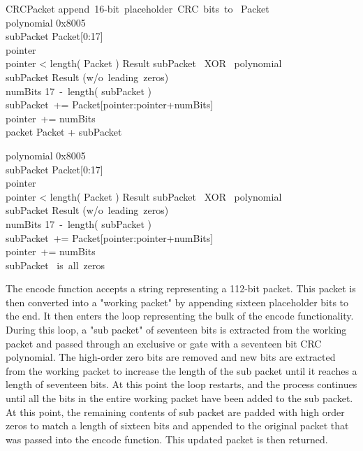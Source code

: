 \documentclass{sigcomm-alternate}
\begin{document}
\begin{pseudocode}{CRC}{Packet}
\mbox{append 16-bit placeholder CRC bits to } Packet\\
polynomial \GETS \mbox{0x8005}\\
subPacket \GETS Packet[0:17]\\
pointer \\
\WHILE pointer < \mbox{length(} Packet \mbox{)}
\DO
\BEGIN
Result \GETS subPacket \mbox{ XOR } polynomial\\
subPacket \GETS Result \mbox{(w/o leading zeros)}\\
numBits \GETS \mbox{17 - length(} subPacket \mbox{)}\\
subPacket\ += Packet[pointer:pointer+numBits]\\
pointer\ += numBits
\END\\
packet \GETS Packet + subPacket\\
\ENDPROCEDURE

polynomial \GETS \mbox{0x8005}\\
subPacket \GETS Packet[0:17]\\
pointer \\
\WHILE pointer < \mbox{length(} Packet \mbox{)}
\DO
\BEGIN
Result \GETS subPacket \mbox{ XOR } polynomial\\
subPacket \GETS Result \mbox{(w/o leading zeros)}\\
numBits \GETS \mbox{17 - length(} subPacket \mbox{)}\\
subPacket\ += Packet[pointer:pointer+numBits]\\
pointer\ += numBits
\END\\
\IF subPacket \mbox{ is all zeros}
\THEN
{}
\ELSE
\THEN
{}
\ENDPROCEDURE
\end{pseudocode}

The encode function accepts a string representing a 112-bit packet. This packet is then converted into a "working packet" by appending sixteen placeholder bits to the end. It then enters the loop representing the bulk of the encode functionality. During this loop, a "sub packet" of seventeen bits is extracted from the working packet and passed through an exclusive or gate with a seventeen bit CRC polynomial. The high-order zero bits are removed and new bits are extracted from the working packet to increase the length of the sub packet until it reaches a length of seventeen bits. At this point the loop restarts, and the process continues until all the bits in the entire working packet have been added to the sub packet. At this point, the remaining contents of sub packet are padded with high order zeros to match a length of sixteen bits and appended to the original packet that was passed into the encode function. This updated packet is then returned.
\end{document}
